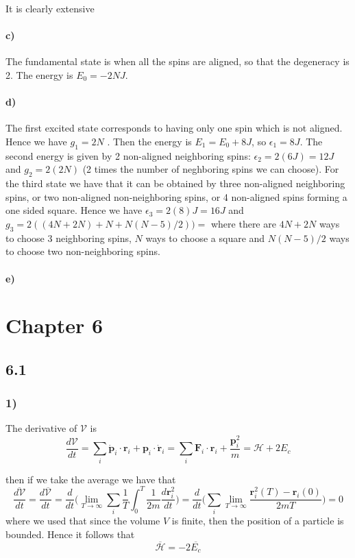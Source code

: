 \documentclass[10pt,a4paper]{book}
\begin{document}
It is clearly extensive
\subsubsection*{c)}

The fundamental state is when all the spins are aligned, so that the degeneracy is 2. The energy is $E_0=-2NJ$. 

\subsubsection*{d)}
The first excited state corresponds to having only one spin which is not aligned. Hence we have $g_1=2N$ . Then the energy is $E_1=E_0+8J$, so $\epsilon_1=8J$. The second energy is given by 2 non-aligned neighboring spins:
$\epsilon_2=2(6J)=12J$ and $g_2=2(2N)$ (2 times the number of neghboring spins we can choose). For the third state we have that it can be obtained by three non-aligned neighboring spins, or two non-aligned non-neighboring spins, or 4 non-aligned spins forming a one sided square. Hence we have $\epsilon_3=2(8)J=16J$ and $g_3=2((4N+2N)+N+N(N-5)/2))=$
where there are $4N+2N$ ways to choose 3 neighboring spins, $N$ ways to choose a square and $N(N-5)/2$ ways to choose two non-neighboring spins.

\subsubsection*{e)}








\chapter*{Chapter 6}


\section*{6.1}
\subsection*{1)}
The derivative of $\mathscr{V}$ is 
$$\frac{d\mathscr{V}}{dt}=\sum_i\dot{\mathbf{p}}_i\cdot \mathbf{r}_i+\mathbf{p}_i\cdot\dot{\mathbf{r}}_i=\sum_i\mathbf{F}_i\cdot \mathbf{r}_i+\frac{\mathbf{p}_i^2}{m}=\mathscr{H}+2E_c$$

then  if we take the average we have that
$$\overline{\frac{d\mathscr{V}}{dt}}=\frac{d\overline{\mathscr{V}}}{dt}=\frac{d}{dt}\bigg(\lim_{T\to\infty}\sum_i\frac{1}{T}\int_0^T\frac{1}{2m}\frac{d\mathbf{r}_i^2}{dt}\bigg)=\frac{d}{dt}\bigg(\sum_i\lim_{T\to\infty}\frac{\mathbf{r}_i^2(T)-\mathbf{r}_i(0)}{2mT}\bigg)=0$$
where we used that since the volume $V$ is finite, then the position of a particle is bounded. Hence it follows that 
$$\overline{\mathscr{H}}=-2\overline{E_c}$$
\end{document}
